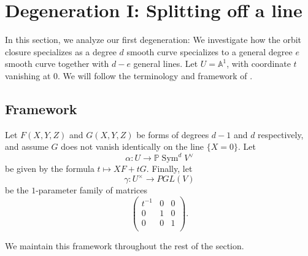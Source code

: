 \documentclass[12 pt, reqno]{amsart}
\theoremstyle{definition}
\newcommand{\on}{\operatorname}
\newcommand{\mb}{\mathbb}
\renewcommand{\P}{\mb{P}}
\begin{document}
\section{Degeneration I: Splitting off a line}

In this section, we analyze our first degeneration: We investigate how
the orbit closure specializes as a degree $d$ smooth curve specializes
to a general degree $e$ smooth curve together with $d-e$ general
lines. Let $U = \mb{A}^{1}$, with coordinate $t$ vanishing at $0$. We
will follow the terminology and framework of
.


\subsection{Framework}
\label{sec:frameworksplit}

Let $F(X,Y,Z)$ and $G(X,Y,Z)$ be forms of degrees $d-1$ and $d$
respectively, and assume $G$ does not vanish identically on the line
$\{X=0\}$. Let \[\alpha: U \to \P \on{Sym}^{d}V^{\vee}\] be given by
the formula $t \mapsto XF + tG$. Finally, let
\[\gamma: U^{\times} \to PGL(V)\] be the $1$-parameter family of
matrices
\[\begin{pmatrix}
    t^{-1} & 0 & 0 \\
    0 & 1 & 0\\
    0 & 0 & 1\\
  \end{pmatrix}.\] 

We maintain this framework throughout the rest of the section.
\end{document}
